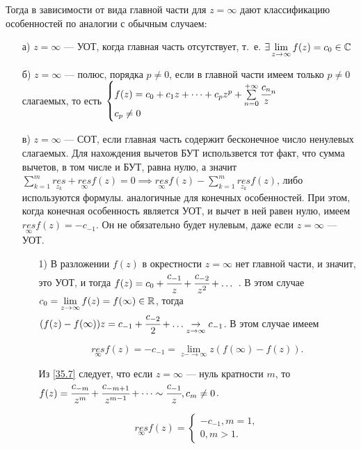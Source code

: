 \documentclass[../../main.tex]{subfiles}
\begin{document}
	 Тогда в зависимости от вида главной части для $z=\infty$ дают классификацию особенностей по аналогии с обычным случаем:
	 \begin{itemize}
	 	\item[а)] $z=\infty$ --- УОТ, когда главная часть отсутствует, т.~е.
	 	$\exists\lim\limits_{z\rightarrow \infty} f(z)=c_0\in \mathbb{C}$
	 	\item[б)] $z=\infty$ --- полюс, порядка $p\neq 0$, если в 
	 	главной части имеем только $p\neq 0$ слагаемых, то есть 
	 	$
	 	\begin{cases}
	 	f(z)=c_0+c_1z+\dots+c_pz^p+\sum\limits_{n=0}^{+\infty}\cfrac{c_n}
	 	z^n\\
	c_p\neq 0
	 	\end{cases}
	 	$ 
	 \item[в)] $z=\infty$ --- СОТ, если главная часть содержит бесконечное число ненулевых слагаемых. Для нахождения вычетов БУТ использвется тот факт, что сумма вычетов, в том числе и БУТ, равна нулю, а значит 
	 $\sum\limits_{k=1}^m\underset{z_k}{res}+\underset{\infty}{res}f(z)=0 \implies\underset{\infty}{res}f(z)-\sum\limits_{k=1}^m \underset{z_k}{res}f(z)$, либо используются формулы. аналогичные для конечных особенностей. При этом, когда конечная особенность является УОТ, и вычет в ней равен нулю, имеем 	$\underset{\infty}{res}f(z)=-c_{-1}.$ Он не обязательно будет нулевым, даже если $z=\infty$ --- УОТ.
	 
	 \begin{itemize}
	 	\item[1)] В разложении $f(z)$ в окрестности $z=\infty$ нет главной части, и значит, это УОТ, и тогда $f(z)=c_0+\cfrac{c_{-1}}{z}+\cfrac{c_{-2}}{z^2}+ \dots$ . В этом случае 
	 	$c_0=\lim\limits_{z\rightarrow \infty}f(z)=f(\infty)\in \mathbb{R}$, тогда 
	 	$(f(z)-f(\infty))z=c_{-1}+\cfrac{c_{-2}}{2}+ \dots\underset{z\rightarrow\infty}{\rightarrow}c_{-1}$. В этом случае имеем 	
	 	
	 	\begin{equation}\label{35.7}
	 	\underset{\infty}{res}f(z)=-c_{-1}= \lim\limits_{z-\rightarrow\infty}z(f(\infty)-f(z)).
	 	\end{equation}
	 	
	 	Из \ref{35.7} следует, что если $z=\infty$ --- нуль кратности $m$, то $f(z)=\cfrac{c_{-m}}{z^m}+ \cfrac{c_{-m+1}}{z^{m-1}}+\dots\sim \cfrac{c_{-1}}{z}, c_m\neq0$.
	 
	 	\[
	 	\underset{\infty}{res}f(z)=
	 	\begin{cases}
	 		-c_{-1}, m=1,\\
	 		0, m>1.
	 	\end{cases}
	 	\]
	 	

\end{itemize}
\end{itemize}
\end{document}
